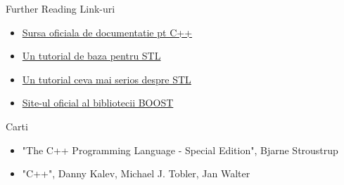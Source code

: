 \documentclass{beamer}
\begin{document}
  \begin{frame}{Further Reading}
  Link-uri
  \begin{itemize}
  \setlength{\itemsep}{0.5cm}
  \item \href{http://www.cplusplus.com/reference}{Sursa oficiala de documentatie pt C++}
  \item \href{http://www.cs.brown.edu/\~jak/proglang/cpp/stltut/tut.html}{Un tutorial de baza pentru STL}
  \item \href{http://www.sgi.com/tech/stl/}{Un tutorial ceva mai serios despre STL}
  \item \href{http://www.boost.org/}{Site-ul oficial al bibliotecii BOOST}
  \end{itemize}
  Carti
  \begin{itemize}
  \item "The C++ Programming Language - Special Edition", Bjarne Stroustrup
  \item "C++", Danny Kalev, Michael J. Tobler, Jan Walter
  \end{itemize}
  \end{frame}
\end{document}
